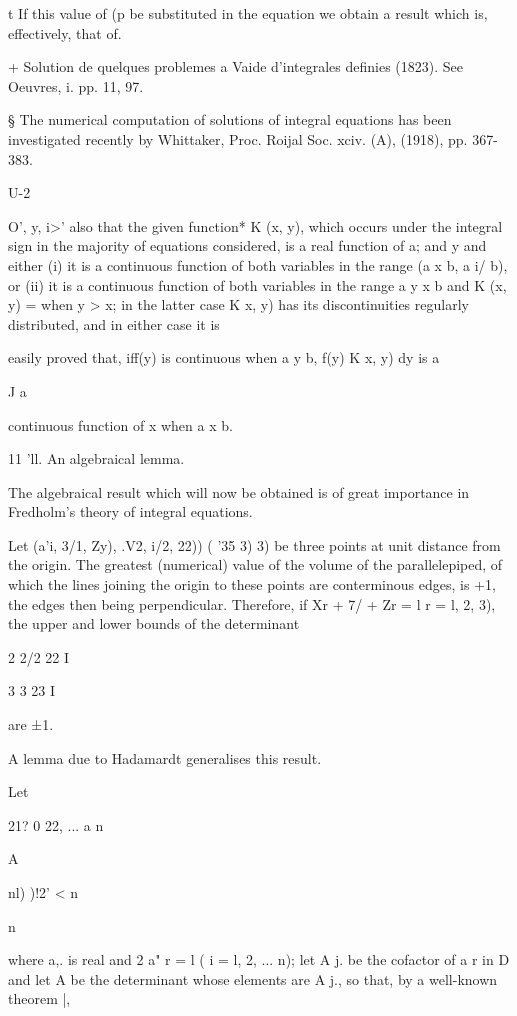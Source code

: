 t If this value of (p be substituted in the equation we obtain a
result which is, effectively, that of.

+ Solution de quelques problemes a Vaide d'integrales definies (1823).
See Oeuvres, i. pp. 11, 97.

§ The numerical computation of solutions of integral equations has
been investigated recently by Whittaker, Proc. Roijal Soc. xciv. (A),
(1918), pp. 367-383.

U-2

%
%

O', y, i>' also that the given function* K (x, y), which occurs under
the integral sign in the majority of equations considered, is a real
function of a; and y and either (i) it is a continuous function of
both variables in the range (a x b, a i/ b), or (ii) it is a
continuous function of both variables in the range a y x b and K (x,
y) = when y > x; in the latter case K x, y) has its discontinuities
regularly distributed, and in either case it is

easily proved that, iff(y) is continuous when a y b, f(y) K x, y) dy
is a

J a

continuous function of x when a x b.

11 'll. An algebraical lemma.

The algebraical result which will now be obtained is of great
importance in Fredholm's theory of integral equations.

Let (a'i, 3/1, Zy), .V2, i/2, 22)) ( '35 3) 3) be three points at
unit distance from the origin. The greatest (numerical) value of the
volume of the parallelepiped, of which the lines joining the origin to
these points are conterminous edges, is +1, the edges then being
perpendicular. Therefore, if Xr + 7/ + Zr = l r = l, 2, 3), the upper
and lower bounds of the determinant

 2 2/2 22 I

 3 3 23 I

are ±1.

A lemma due to Hadamardt generalises this result.

Let

 21? 0 22, ... a n

A

 nl) )!2'  < n

n

where a,. is real and 2 a" r = l ( i = l, 2, ... n); let A j. be the
cofactor of a r in D and let A be the determinant whose elements are A
j., so that, by a well-known theorem |,

